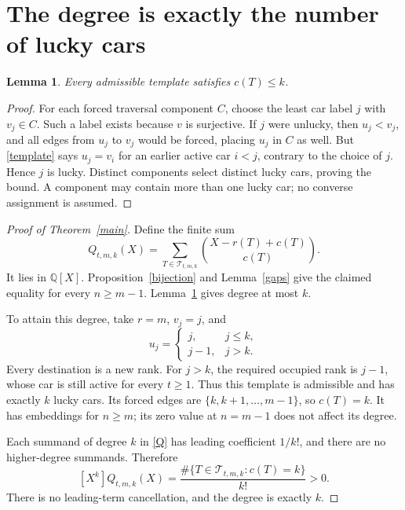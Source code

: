 \documentclass[11pt]{article}
\newtheorem{lemma}{Lemma}
\theoremstyle{definition}
\newcommand{\T}{\mathcal T}
\begin{document}
\section{The degree is exactly the number of lucky cars}
\begin{lemma}\label{components}
Every admissible template satisfies $c(T)\le k$.
\end{lemma}
\begin{proof}
For each forced traversal component $C$, choose the least car label $j$ with $v_j\in C$. Such a label exists because $v$ is surjective. If $j$ were unlucky, then $u_j<v_j$, and all edges from $u_j$ to $v_j$ would be forced, placing $u_j$ in $C$ as well. But \eqref{template} says $u_j=v_i$ for an earlier active car $i<j$, contrary to the choice of $j$. Hence $j$ is lucky. Distinct components select distinct lucky cars, proving the bound. A component may contain more than one lucky car; no converse assignment is assumed.
\end{proof}
\begin{proof}[Proof of Theorem~\ref{main}]
Define the finite sum
\begin{equation}\label{Q}
 Q_{t,m,k}(X)=\sum_{T\in\T_{t,m,k}}
       \binom{X-r(T)+c(T)}{c(T)}.
\end{equation}
It lies in $\mathbb Q[X]$. Proposition~\ref{bijection} and Lemma~\ref{gaps} give the claimed equality for every $n\ge m-1$. Lemma~\ref{components} gives degree at most $k$.

To attain this degree, take $r=m$, $v_j=j$, and
\begin{equation}\label{top}
 u_j=\begin{cases}j,&j\le k,\\j-1,&j>k.\end{cases}
\end{equation}
Every destination is a new rank. For $j>k$, the required occupied rank is $j-1$, whose car is still active for every $t\ge1$. Thus this template is admissible and has exactly $k$ lucky cars. Its forced edges are $\{k,k+1,\ldots,m-1\}$, so $c(T)=k$. It has embeddings for $n\ge m$; its zero value at $n=m-1$ does not affect its degree.

Each summand of degree $k$ in \eqref{Q} has leading coefficient $1/k!$, and there are no higher-degree summands. Therefore
\[
 [X^k]Q_{t,m,k}(X)
 =\frac{\#\{T\in\T_{t,m,k}:c(T)=k\}}{k!}>0.
\]
There is no leading-term cancellation, and the degree is exactly $k$.
\end{proof}
\end{document}
